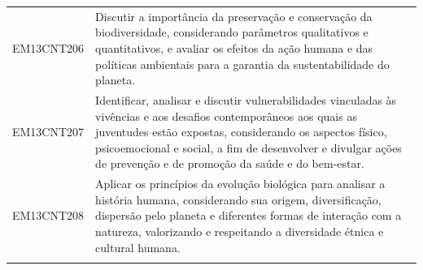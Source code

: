 \documentclass[12pt]{extarticle}
\begin{document}
\begin{longtable}{ll}
EM13CNT206 & Discutir a importância da preservação e conservação da biodiversidade, considerando parâmetros qualitativos e quantitativos, e avaliar os efeitos da ação humana e das políticas ambientais para a garantia da sustentabilidade do planeta.                                                                                                                                                                                                                                                                                                                                                                                                                                                                                                                                                                           \\
\rowcolor[HTML]{E0F7FA} 
EM13CNT207 & Identificar, analisar e discutir vulnerabilidades vinculadas às vivências e aos desafios contemporâneos aos quais as juventudes estão expostas, considerando os aspectos físico, psicoemocional e social, a fim de desenvolver e divulgar ações de prevenção e de promoção da saúde e do bem-estar.                                                                                                                                                                                                                                                                                                                                                                                                                                                                                                                   \\
\rowcolor[HTML]{FFF} 
EM13CNT208 & Aplicar os princípios da evolução biológica para analisar a história humana, considerando sua origem, diversificação, dispersão pelo planeta e diferentes formas de interação com a natureza, valorizando e respeitando a diversidade étnica e cultural humana.                                                                                                                                                                                                                                                                                                                                                                                                                                                                                                                                                       \\
\rowcolor[HTML]{E0F7FA} 

\end{longtable}
\end{document}
